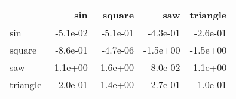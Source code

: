\begin{tabular}{lrrrr}
\toprule
{} &      sin &   square &      saw &  triangle \\
\midrule
sin      & -5.1e-02 & -5.1e-01 & -4.3e-01 &  -2.6e-01 \\
square   & -8.6e-01 & -4.7e-06 & -1.5e+00 &  -1.5e+00 \\
saw      & -1.1e+00 & -1.6e+00 & -8.0e-02 &  -1.1e+00 \\
triangle & -2.0e-01 & -1.4e+00 & -2.7e-01 &  -1.0e-01 \\
\bottomrule
\end{tabular}
